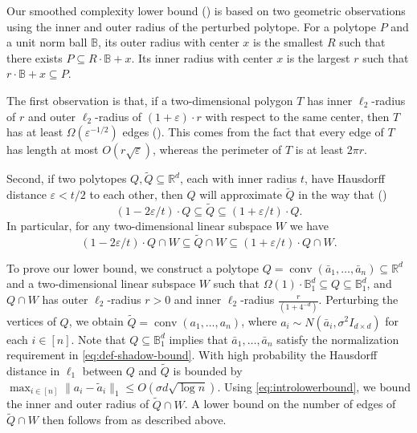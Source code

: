 \documentclass{theoretics}
\newcommand{\R}{\mathbb R}
\newcommand{\eps}{\varepsilon} %
\renewcommand{\epsilon}{\varepsilon} %
\newcommand{\conv}{\operatorname{conv}}
\renewcommand{\subset}{\subseteq}
\begin{document}
Our smoothed complexity lower bound () is based
on two geometric observations using the inner and outer radius of the perturbed polytope.
For a polytope $P$ and a unit norm ball $\mathbb{B}$, its outer radius with center $x$ is the smallest $R$ such that there exists  $P \subset R \cdot \mathbb{B} + x$.
Its inner radius with center $x$ is the largest $r$ such that $r \cdot \mathbb{B} + x \subset P$.

The first observation is that, if a two-dimensional polygon $T$ has
inner $\ell_2$-radius of $r$ and outer $\ell_2$-radius of $(1 + \epsilon) \cdot r$ with respect to the same center, then $T$ has
at least $\Omega(\epsilon^{-1/2})$ edges (). This comes
from the fact that every edge of $T$ has length at most $O(r\sqrt{\epsilon})$,
whereas the perimeter of $T$ is at least $2\pi r$.

Second, if two polytopes $Q, \tilde{Q} \subseteq \R^d$, each with inner radius $t$,
have Hausdorff distance $\epsilon < t/2$ to each other, 
then $Q$ will approximate $\tilde{Q}$ in the way that ()
$$(1 - 2\epsilon/t)\cdot Q \subseteq \tilde{Q} \subseteq (1 + \epsilon/t)\cdot Q.$$
In particular, for any two-dimensional linear subspace $W$ we have
\begin{equation}\label{eq:introlowerbound}
    (1 - 2\eps/t)\cdot Q \cap W \subseteq \tilde{Q} \cap W \subseteq (1 + \eps/t)\cdot Q \cap W.
\end{equation}

To prove our lower bound, we construct a polytope 
$Q = \conv(\bar{a}_1, \ldots, \bar{a}_n) \subset \R^d$
and a two-dimensional linear subspace $W$ such that
$\Omega(1) \cdot  \mathbb{B}^d_1 \subset Q \subset \mathbb{B}^d_1$,
and $Q \cap W$ has outer $\ell_2$-radius $r > 0$ and inner $\ell_2$-radius $\frac{r}{(1+4^{-d})}$.
Perturbing the vertices of $Q$, we obtain
$\tilde{Q} = \conv(a_1,\ldots, a_n)$, where $a_i \sim N(\bar a_i, \sigma^2 I_{d\times d})$ for each $i \in [n]$.
Note that $Q \subset \mathbb B_1^d$ implies that $\bar a_1,\dots,\bar a_n$ satisfy
the normalization requirement in \eqref{eq:def-shadow-bound}.
With high probability the Hausdorff distance in $\ell_1$ between $Q$ and $\tilde Q$ is bounded by
$\max_{i \in [n]} \|a_i - \tilde{a}_i\|_1 \leq O(\sigma d\sqrt{\log n})$.
Using \eqref{eq:introlowerbound}, we bound the inner and outer radius of $\tilde Q \cap W$.
A lower bound on the number of edges of $\tilde Q \cap W$ then follows from  as described above.
\end{document}

